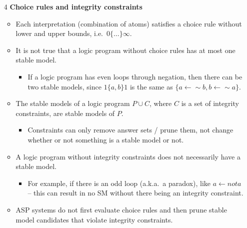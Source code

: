 \documentclass[9pt,a4paper,landscape]{article}
\begin{document}
{\begin{itemize}
	\item[4] \textbf{Choice rules and integrity constraints}
	\begin{itemize}[noitemsep]
		\item Each interpretation (combination of atoms) satisfies a choice rule without lower and upper bounds, i.e.\ $0 \{ \ldots \} \infty$.
		\item It is not true that a logic program without choice rules has at most one stable model.
		\begin{itemize}[noitemsep]
			\item If a logic program has even loops through negation, then there can be two stable models, since $1\{a, b\}1$ is the same as $\{a \leftarrow {\sim} b, b \leftarrow {\sim} a\}$.
		\end{itemize} 
		\item The stable models of a logic program $P \cup C$, where $C$ is a set of integrity constraints, are stable models of $P$.
		\begin{itemize}[noitemsep]
			\item Constraints can only remove answer sets / prune them, not change whether or not something is a stable model or not.
		\end{itemize}
		\item A logic program without integrity constraints does not necessarily have a stable model.
		\begin{itemize}[noitemsep]
			\item For example, if there is an odd loop (a.k.a.\ a paradox), like $a \leftarrow not a$ -- this can result in no SM without there being an integrity constraint.
		\end{itemize}
		\item ASP systems do not first evaluate choice rules and then prune stable model candidates that violate integrity constraints.
	\end{itemize}
	

\end{itemize}}
\end{document}
